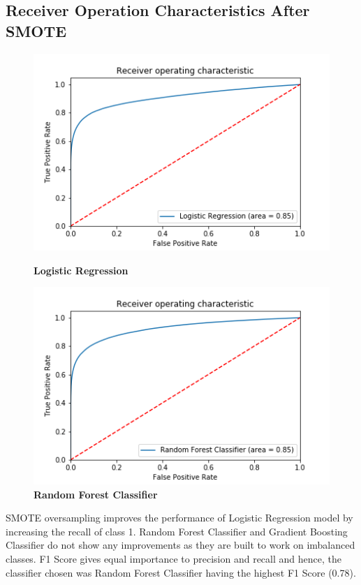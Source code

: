 \documentclass[12pt]{extarticle}
\begin{document}
\subsection*{Receiver Operation Characteristics After SMOTE}
\begin{figure}[h]
    \centering
        \includegraphics[scale=0.45]{AfterSMOTE/LogisticRegressorROC.png}
    \caption{\textbf{Logistic Regression}}
    \label{figure:4}
        \includegraphics[scale=0.45]{AfterSMOTE/RandomForestClassifierROC.png}
    \caption{\textbf{Random Forest Classifier}}
    \label{figure:5}
\end{figure}

SMOTE oversampling improves the performance of Logistic Regression model by increasing the recall of class 1. Random Forest Classifier and Gradient Boosting Classifier do not show any improvements as they are built to work on imbalanced classes. F1 Score gives equal importance  to precision and recall and hence, the classifier chosen was Random Forest Classifier having the highest F1 Score (0.78).

\newpage
\end{document}
